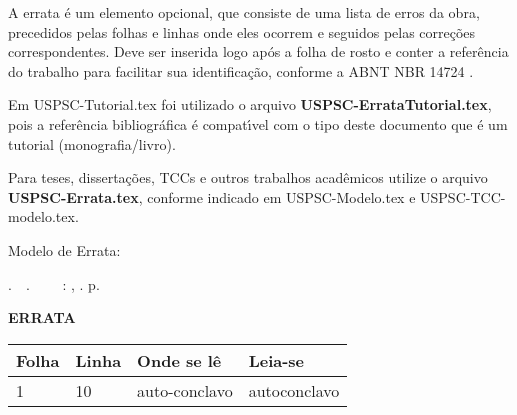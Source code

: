 \begin{errata}
	A errata \'e um elemento opcional, que consiste de uma lista de erros da obra, precedidos pelas folhas e linhas onde eles ocorrem e seguidos pelas corre\c{c}\~oes correspondentes. Deve ser inserida logo ap\'os a folha de rosto e conter a refer\^encia do trabalho para facilitar sua identifica\c{c}\~ao, conforme a ABNT NBR 14724 \cite{nbr14724}. 
	
    Em USPSC-Tutorial.tex foi utilizado o arquivo \textbf{USPSC-ErrataTutorial.tex}, pois a refer\^encia bibliogr\'afica \'e compat\'{\i}vel com o tipo deste documento que \'e um tutorial (monografia/livro). 
    
    Para teses, disserta\c{c}\~oes, TCCs e outros trabalhos acad\^emicos utilize o arquivo \textbf{USPSC-Errata.tex}, conforme indicado em  USPSC-Modelo.tex e USPSC-TCC-modelo.tex. 
    
       
	Modelo de Errata:
		
	\begin{flushleft} 
			\setlength{\absparsep}{0pt} %
			\SingleSpacing 
			\imprimirautorabr.~~\textbf{\imprimirtituloresumo}.~~\imprimirorientador~~	
			\imprimirlocal: \imprimirinstituicao, \imprimirdata. \pageref{LastPage}p. 
 	\end{flushleft}
\vspace{\onelineskip}
\OnehalfSpacing 
\center
\textbf{ERRATA}
\vspace{\onelineskip}
\OnehalfSpacing 
\begin{table}[Htb]
	\center
	\footnotesize
	\begin{tabular}{p{2cm} p{2cm} p{4cm} p{4cm} }
		\hline
		\textbf{Folha} & \textbf{Linha}  & \textbf{Onde se l\^e}  & \textbf{Leia-se}  \\
			\hline
			1 & 10 & auto-conclavo & autoconclavo\\
		\hline
	\end{tabular}
\end{table}
\end{errata}
